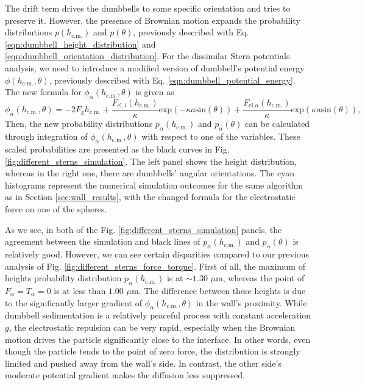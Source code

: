 \documentclass{master_thesis}
\begin{document}
The drift term drives the dumbbells to some specific orientation and tries to preserve it. However, the presence of Brownian motion expands the probability distributions $p(h_{\textrm{c.m.}})$ and $p(\theta)$, previously described with Eq. \eqref{eqn:dumbbell_height_distribution} and \eqref{eqn:dumbbell_orientation_distribution}. For the dissimilar Stern potentials analysis, we need to introduce a modified version of dumbbell's potential energy $\phi(h_{\textrm{c.m.}}, \theta)$, previously described with Eq. \eqref{eqn:dumbbell_potential_energy}. The new formula for $\phi_\alpha(h_{\textrm{c.m.}}, \theta)$ is given as
\begin{equation}
    \phi_\alpha(h_{\textrm{c.m.}}, \theta) = -2 F_\textrm{g} h_{\textrm{c.m.}} + \frac{ F_{\textrm{el},i}(h_{\textrm{c.m.}})}{\kappa} \textrm{exp}\left( -\kappa a \textrm{sin}(\theta) \right) + \frac{ F_{\textrm{el,}\alpha}(h_{\textrm{c.m.}})}{\kappa} \textrm{exp}\left( \kappa a \textrm{sin}(\theta) \right),
\label{eqn:scaled_dumbbell_potential_energy}
\end{equation}
Then, the new probability distributions $p_\alpha(h_{\textrm{c.m.}})$ and $p_\alpha(\theta)$ can be calculated through integration of $\phi_\alpha(h_{\textrm{c.m.}}, \theta)$ with respect to one of the variables. These scaled probabilities are presented as the black curves in Fig. \ref{fig:different_sterns_simulation}. The left panel shows the height distribution, whereas in the right one, there are dumbbells' angular orientations. The cyan histograms represent the numerical simulation outcomes for the same algorithm as in Section \ref{sec:wall_results}, with the changed formula for the electrostatic force on one of the spheres.

As we see, in both of the Fig. \ref{fig:different_sterns_simulation} panels, the agreement between the simulation and black lines of $p_\alpha(h_{\textrm{c.m.}})$ and $p_\alpha(\theta)$ is relatively good. However, we can see certain disparities compared to our previous analysis of Fig. \ref{fig:different_sterns_force_torque}. First of all, the maximum of heights probability distribution $p_\alpha(h_{\textrm{c.m.}})$ is at $\sim 1.30$ $\mu$m, whereas the point of $F_{\alpha}=T_{\alpha}=0$ is at less than $1.00$ $\mu$m. The difference between these heights is due to the significantly larger gradient of $\phi_{\alpha}(h_{\textrm{c.m.}},\theta)$ in the wall's proximity. While dumbbell sedimentation is a relatively peaceful process with constant acceleration $g$, the electrostatic repulsion can be very rapid, especially when the Brownian motion drives the particle significantly close to the interface. In other words, even though the particle tends to the point of zero force, the distribution is strongly limited and pushed away from the wall's side. In contrast, the other side's moderate potential gradient makes the diffusion less suppressed.
\end{document}
